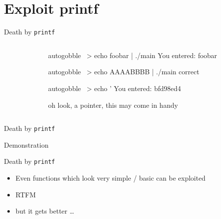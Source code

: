 \documentclass[beamer]{uibk}
\begin{document}
\section{Exploit printf}

\begin{frame}[fragile]{Death by \texttt{printf}}
    \begin{columns}
        \begin{column}{0.5\textwidth}
        \end{column}
        \begin{column}{0.5\textwidth}
            \pause
            \begin{pre*}{autogobble}
                ~> echo foobar | ./main
                You entered:
                foobar
            \end{pre*}
            \bigskip\pause
            \begin{pre*}{autogobble}
                ~> echo AAAABBBB | ./main
                correct
            \end{pre*}
            \bigskip\pause
            \begin{pre*} {autogobble}
                ~> echo '%
                You entered:
                bfd98ed4
            \end{pre*}
            \medskip
            oh look, a pointer, this may come in handy
        \end{column}
    \end{columns}
\end{frame}

\begin{frame}{Death by \texttt{printf}}
    \begin{center}
        \huge Demonstration
    \end{center}
\end{frame}

\begin{frame}{Death by \texttt{printf}}
    \begin{itemize}
        \item Even functions which look very simple / basic can be exploited
        \bigskip
        \item RTFM
        \bigskip
        \pause
        \item but it gets better \dots
    \end{itemize}
\end{frame}
\end{document}
